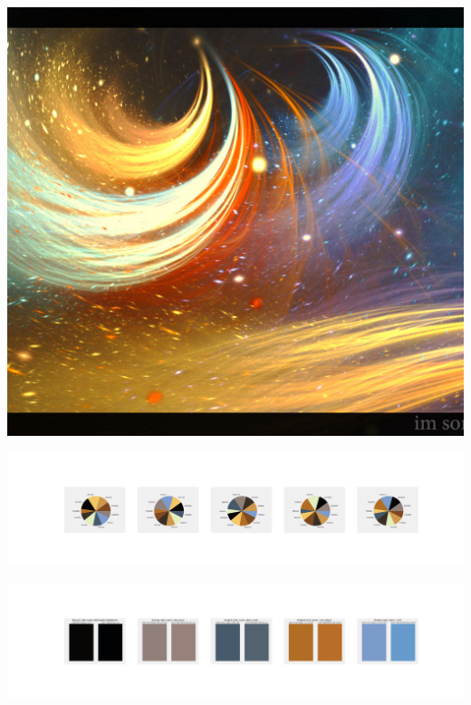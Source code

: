 \documentclass[11pt]{article}
\begin{document}
\begin{landscape}
    \begin{center}
    \includegraphics[width=\textwidth]{./nbimg/file (128).jpg}
    \end{center}

    \begin{center}
    \includegraphics[width=250mm]{./nbimg/pie-32.jpg}
    \end{center}

    \begin{center}
    \includegraphics[width=250mm]{./nbimg/peak-32.jpg}
    \end{center}
    


\end{landscape}
\end{document}
